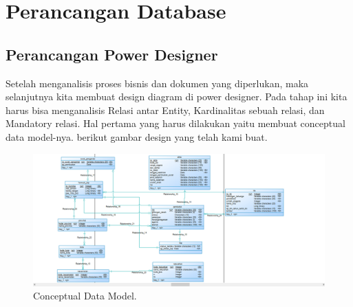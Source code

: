 \chapter{Perancangan Database}

\section{Perancangan Power Designer}
Setelah menganalisis proses bisnis dan dokumen yang diperlukan, maka selanjutnya kita membuat design diagram di power designer. Pada tahap ini kita harus bisa menganalisis Relasi antar Entity, Kardinalitas sebuah relasi, dan Mandatory relasi. Hal pertama yang harus dilakukan yaitu membuat conceptual data model-nya. berikut gambar design yang telah kami buat.\\

\begin{figure}[H]
	\centering
	\includegraphics[width=20cm]{figures/cdm.png}
	\caption{Conceptual Data Model.}	
\end{figure}

